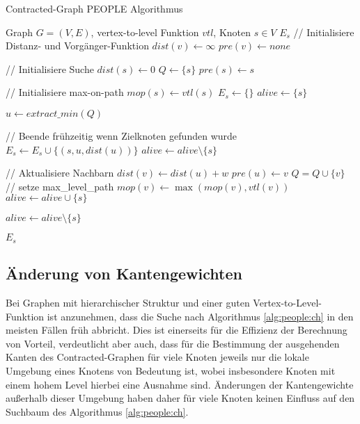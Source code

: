 \begin{algorithm}[p]
  \caption{Contracted-Graph PEOPLE Algorithmus}
  \begin{algorithmic}[1]
    \Require Graph $G = (V, E)$, vertex-to-level Funktion ${vtl}$, Knoten $s \in V$
    \Ensure $E_s$
    \State // Initialisiere Distanz- und Vorgänger-Funktion
    \State ${dist}(v) \leftarrow \infty$
    \State ${pre}(v) \leftarrow {none}$
    \EndFor

    \State
    \State // Initialisiere Suche
    \State ${dist}(s) \leftarrow 0$
    \State $Q\leftarrow \{ s \}$
    \State ${pre}(s) \leftarrow s$

    \State
    \State // Initialisiere max-on-path
    \State ${mop}(s) \leftarrow {vtl}(s)$
    \State $E_s \leftarrow \{ \}$
    \State ${alive} \leftarrow \{ s \}$

    \State
    \State $u \leftarrow{extract\_min}(Q)$\label{graphs:dijkstra:pop}

    \State
    \State // Beende frühzeitig wenn Zielknoten gefunden wurde
    \State $E_s \leftarrow E_s \cup \{ (s, u, {dist}(u)) \}$
    \State ${alive} \leftarrow {alive} \setminus \{ s \}$
    \EndIf

    \State
    \State // Aktualisiere Nachbarn
    \State ${dist}(v) \leftarrow {dist}(u) + w$
    \State ${pre}(u) \leftarrow v$
    \State $Q = Q \cup \{ v \}$
    \State
    \State // setze max\_level\_path
    \State ${mop}(v) \leftarrow \max({mop}(v), {vtl}(v))$
    \State ${alive} \leftarrow {alive} \cup \{ s \}$
    \EndIf
    \EndIf
    \EndFor

    \State ${alive} \leftarrow {alive} \setminus \{ s \}$

    \EndWhile

    \State
    \State \Return $E_s$
  \end{algorithmic}
  \label{alg:people:ch}
\end{algorithm}

\subsection{Änderung von Kantengewichten}

Bei Graphen mit hierarchischer Struktur und einer guten Vertex-to-Level-Funktion ist anzunehmen, dass die Suche nach Algorithmus \ref{alg:people:ch}  in den meisten Fällen früh abbricht.
Dies ist einerseits für die Effizienz der Berechnung von Vorteil, verdeutlicht aber auch, dass für die Bestimmung der ausgehenden Kanten des Contracted-Graphen für viele Knoten jeweils nur die lokale Umgebung eines Knotens von Bedeutung ist, wobei insbesondere Knoten mit einem hohem Level hierbei eine Ausnahme sind.
Änderungen der Kantengewichte außerhalb dieser Umgebung haben daher für viele Knoten keinen Einfluss auf den Suchbaum des Algorithmus \ref{alg:people:ch}.

